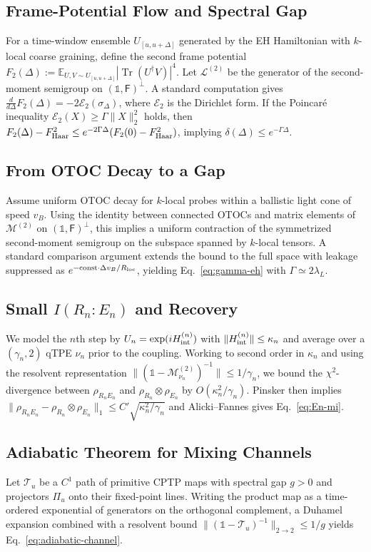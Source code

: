 \documentclass[11pt,a4paper]{article}
\providecommand{\texorpdfstring}[2]{#1}
\newcommand{\Tr}{\operatorname{Tr}}
\theoremstyle{plain}
\theoremstyle{definition}
\theoremstyle{remark}
\begin{document}
\subsection{Frame-Potential Flow and Spectral Gap}
For a time-window ensemble $U_{[u,u+\Delta]}$ generated by the EH Hamiltonian with $k$-local coarse graining, define the second frame potential $F_2(\Delta) := \mathbb{E}_{U,V \sim U_{[u,u+\Delta]}} |\Tr(U^\dagger V)|^4$. Let $\mathcal{L}^{(2)}$ be the generator of the second-moment semigroup on $(\mathbb{1}, \mathsf{F})^\perp$. A standard computation gives $\frac{d}{d\Delta} F_2(\Delta) = -2 \mathcal{E}_2(\sigma_\Delta)$, where $\mathcal{E}_2$ is the Dirichlet form. If the Poincaré inequality $\mathcal{E}_2(X) \ge \Gamma \|X\|_2^2$ holds, then $F_2(\Delta) - F_{\rm Haar}^2 \le e^{-2\Gamma\Delta} (F_2(0) - F_{\rm Haar}^2)$, implying $\delta(\Delta) \le e^{-\Gamma\Delta}$.

\subsection{From OTOC Decay to a Gap}
Assume uniform OTOC decay for $k$-local probes within a ballistic light cone of speed $v_B$. Using the identity between connected OTOCs and matrix elements of $\mathcal{M}^{(2)}$ on $(\mathbb{1}, \mathsf{F})^\perp$, this implies a uniform contraction of the symmetrized second-moment semigroup on the subspace spanned by $k$-local tensors. A standard comparison argument extends the bound to the full space with leakage suppressed as $e^{-\text{const}\cdot \Delta v_B/R_{\rm loc}}$, yielding Eq.~\eqref{eq:gamma-eh} with $\Gamma \simeq 2\lambda_L$.

\subsection{Small \texorpdfstring{$I(R_n:E_n)$}{I(Rn:En)} and Recovery}
We model the $n$th step by $U_n = \exp(iH^{(n)}_{\rm int})$ with $\|H^{(n)}_{\rm int}\| \le \kappa_n$ and average over a $(\gamma_n, 2)$ qTPE $\nu_n$ prior to the coupling. Working to second order in $\kappa_n$ and using the resolvent representation $\|(\mathbb{1} - \mathcal{M}^{(2)}_{\nu_n})^{-1}\| \le 1/\gamma_n$, we bound the $\chi^2$-divergence between $\rho_{R_n E_n}$ and $\rho_{R_n} \otimes \rho_{E_n}$ by $O(\kappa_n^2/\gamma_n)$. Pinsker then implies $\|\rho_{R_n E_n} - \rho_{R_n} \otimes \rho_{E_n}\|_1 \le C'\sqrt{\kappa_n^2/\gamma_n}$ and Alicki--Fannes gives Eq.~\eqref{eq:En-mi}.

\subsection{Adiabatic Theorem for Mixing Channels}
Let $\mathcal{T}_u$ be a $C^1$ path of primitive CPTP maps with spectral gap $g > 0$ and projectors $\Pi_u$ onto their fixed-point lines. Writing the product map as a time-ordered exponential of generators on the orthogonal complement, a Duhamel expansion combined with a resolvent bound $\|(\mathbb{1} - \mathcal{T}_u)^{-1}\|_{2\to 2} \le 1/g$ yields Eq.~\eqref{eq:adiabatic-channel}.
\end{document}

